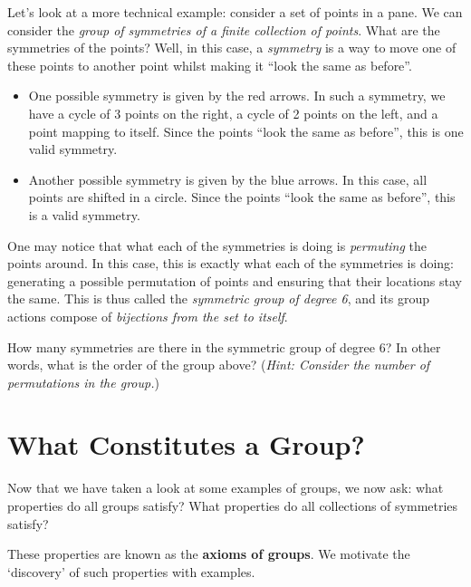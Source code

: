 Let’s look at a more technical example: consider a set of points in a pane. We can consider the \textit{group of symmetries of a finite collection of points}. What are the symmetries of the points? Well, in this case, a \textit{symmetry} is a way to move one of these points to another point whilst making it ``look the same as before''.

\begin{itemize}
    \item One possible symmetry is given by the red arrows. In such a symmetry, we have a cycle of 3 points on the right, a cycle of 2 points on the left, and a point mapping to itself. Since the points ``look the same as before'', this is one valid symmetry.
    \item Another possible symmetry is given by the blue arrows. In this case, all points are shifted in a circle. Since the points ``look the same as before'', this is a valid symmetry.
\end{itemize}

One may notice that what each of the symmetries is doing is \textit{permuting} the points around. In this case, this is exactly what each of the symmetries is doing: generating a possible permutation of points and ensuring that their locations stay the same. This is thus called the \textit{symmetric group of degree 6}, and its group actions compose of \textit{bijections from the set to itself}.

\begin{exercise}
    How many symmetries are there in the symmetric group of degree 6? In other words, what is the order of the group above? (\textit{Hint: Consider the number of permutations in the group.})
\end{exercise}

\section{What Constitutes a Group?}
Now that we have taken a look at some examples of groups, we now ask: what properties do all groups satisfy? What properties do all collections of symmetries satisfy?

These properties are known as the \textbf{axioms of groups}. We motivate the `discovery’ of such properties with examples.

\begin{figure}
    \centering
\end{figure}

